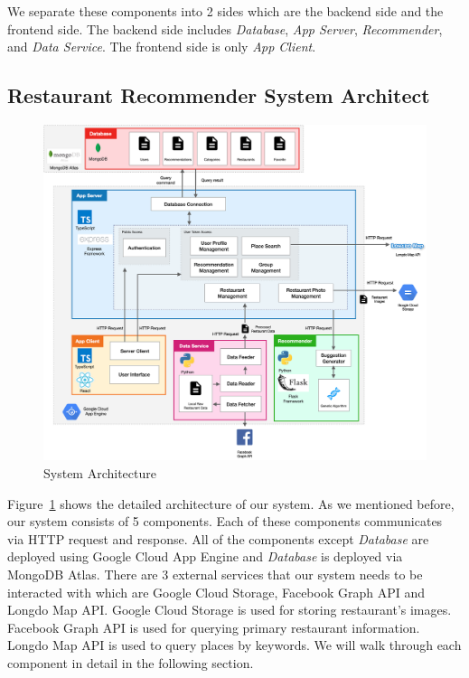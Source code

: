 \documentclass[12pt,oneside,openright,a4paper]{cpe-english-project}
\begin{document}
We separate these components into 2 sides which are the backend side and the frontend side. The backend side includes \textit{Database}, \textit{App Server}, \textit{Recommender}, and \textit{Data Service}. The frontend side is only \textit{App Client}.


\newpage
\subsection{Restaurant Recommender System Architect}

\begin{figure}[H]\centering
\includegraphics[width=400pt]{./images/3architect.png}
\caption{System Architecture}\label{fig:3architect}
\end{figure}\vspace{-24pt}

Figure~\ref{fig:3architect} shows the detailed architecture of our system. As we mentioned before, our system consists of 5 components. Each of these components communicates via HTTP request and response. All of the components except \textit{Database} are deployed using Google Cloud App Engine and \textit{Database} is deployed via MongoDB Atlas. There are 3 external services that our system needs to be interacted with which are Google Cloud Storage, Facebook Graph API and Longdo Map API. Google Cloud Storage is used for storing restaurant’s images. Facebook Graph API is used for querying primary restaurant information. Longdo Map API is used to query places by keywords. We will walk through each component in detail in the following section.
\end{document}
